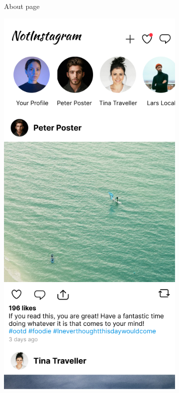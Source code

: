 \documentclass[a4paper, 12pt]{article}
\begin{document}
\begin{figure}[h]
\begin{subfigure}{0.24\linewidth}
\begin{center}
    \end{center}
    \caption{About page}\label{subfig:about}
  \end{subfigure}
  \begin{subfigure}{0.24\linewidth}
    \begin{center}
      \includegraphics[width=\linewidth, height=0.3\textheight, keepaspectratio,frame]{img/ig-clone/Feed.png}

\end{center}
\end{subfigure}
\end{figure}
\end{document}
